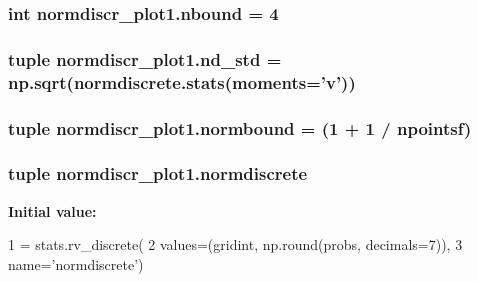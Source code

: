 \subsubsection[{nbound}]{\setlength{\rightskip}{0pt plus 5cm}int normdiscr\+\_\+plot1.\+nbound = 4}\label{namespacenormdiscr__plot1_a45ad13d7c59285146303f9301fad25dc}
\hypertarget{namespacenormdiscr__plot1_a6586cc3d111854363bd04edaa6bb15f2}{}
\subsubsection[{nd\+\_\+std}]{\setlength{\rightskip}{0pt plus 5cm}tuple normdiscr\+\_\+plot1.\+nd\+\_\+std = {\bf np.\+sqrt}(normdiscrete.\+stats(moments='v'))}\label{namespacenormdiscr__plot1_a6586cc3d111854363bd04edaa6bb15f2}
\hypertarget{namespacenormdiscr__plot1_abc9ece7a52dab740df885505bfde3cce}{}
\subsubsection[{normbound}]{\setlength{\rightskip}{0pt plus 5cm}tuple normdiscr\+\_\+plot1.\+normbound = (1 + 1 / {\bf npointsf})}\label{namespacenormdiscr__plot1_abc9ece7a52dab740df885505bfde3cce}
\hypertarget{namespacenormdiscr__plot1_a98bd5496f1b34315e1a9969be6bce109}{}
\subsubsection[{normdiscrete}]{\setlength{\rightskip}{0pt plus 5cm}tuple normdiscr\+\_\+plot1.\+normdiscrete}\label{namespacenormdiscr__plot1_a98bd5496f1b34315e1a9969be6bce109}
{\bfseries Initial value\+:}
\begin{DoxyCode}
1 = stats.rv\_discrete(
2                         values=(gridint, np.round(probs, decimals=7)),
3                         name=\textcolor{stringliteral}{'normdiscrete'})
\end{DoxyCode}
\hypertarget{namespacenormdiscr__plot1_a05db0418bf9e3cb9363768346fd33093}{}
